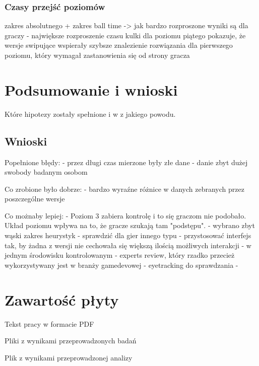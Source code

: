 \documentclass[a4paper,12pt,numbers=noenddot]{report}
\begin{document}
\subsection{Czasy przejść poziomów}
zakres absolutnego + zakres ball time -> jak bardzo rozproszone wyniki są dla graczy - największe rozproszenie czasu kulki dla poziomu piątego pokazuje, że wersje swipujące wspierały szybsze znalezienie rozwiązania dla pierwszego poziomu, który wymagał zastanowienia się od strony gracza



\chapter{Podsumowanie i wnioski}

Które hipotezy zostały spełnione i w z jakiego powodu.


\section{Wnioski}
Popełnione błędy: 
- przez długi czas mierzone były złe dane
- danie zbyt dużej swobody badanym osobom

Co zrobione było dobrze:
- bardzo  wyraźne różnice w danych zebranych przez poszczególne wersje

Co możnaby lepiej:
- Poziom 3 zabiera kontrolę i to się graczom nie podobało. Układ poziomu wpływa na to, że gracze szukają tam "podstępu".
- wybrano zbyt wąski zakres heurystyk
- sprawdzić dla gier innego typu
- przystosować interfejs tak, by żadna z wersji nie cechowała się większą ilością możliwych interakcji
- w jednym środowisku kontrolowanym
- experts review, który rzadko przecież wykorzystywany jest w branży gamedevowej
- eyetracking do sprawdzania
- 



 

\renewcommand{\listoffigures}{\begingroup
\tocchapter
{}
\endgroup}
\listoffigures
\chapter{Zawartość płyty}
\begin{enumerate}[label={[\arabic*]}]
  \item Tekst pracy w formacie PDF
  \item Pliki z wynikami przeprowadzonych badań
  \item Plik z wynikami przeprowadzonej analizy
\end{enumerate}
\end{document}
